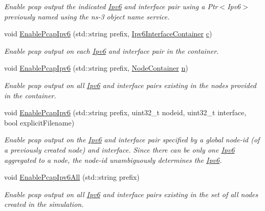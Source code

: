 \begin{DoxyCompactItemize}
\begin{DoxyCompactList}\small\item\em Enable pcap output the indicated \hyperlink{classns3_1_1Ipv6}{Ipv6} and interface pair using a Ptr$<$\+Ipv6$>$ previously named using the ns-\/3 object name service. \end{DoxyCompactList}\item 
void \hyperlink{classns3_1_1PcapHelperForIpv6_ab15e3eba350543f84b6fd16d2e2034ea}{Enable\+Pcap\+Ipv6} (std\+::string prefix, \hyperlink{classns3_1_1Ipv6InterfaceContainer}{Ipv6\+Interface\+Container} \hyperlink{mmwave_2model_2fading-traces_2fading__trace__generator_8m_ae0323a9039add2978bf5b49550572c7c}{c})
\begin{DoxyCompactList}\small\item\em Enable pcap output on each \hyperlink{classns3_1_1Ipv6}{Ipv6} and interface pair in the container. \end{DoxyCompactList}\item 
void \hyperlink{classns3_1_1PcapHelperForIpv6_ae4206173dfd9b487f208d28b72b91399}{Enable\+Pcap\+Ipv6} (std\+::string prefix, \hyperlink{classns3_1_1NodeContainer}{Node\+Container} \hyperlink{lte__link__budget__x2__handover__measures_8m_abdb05bc5a064cf642a06c83b3392f148}{n})
\begin{DoxyCompactList}\small\item\em Enable pcap output on all \hyperlink{classns3_1_1Ipv6}{Ipv6} and interface pairs existing in the nodes provided in the container. \end{DoxyCompactList}\item 
void \hyperlink{classns3_1_1PcapHelperForIpv6_a752abfab8560e9b57539d0e01d3ec1f1}{Enable\+Pcap\+Ipv6} (std\+::string prefix, uint32\+\_\+t nodeid, uint32\+\_\+t interface, bool explicit\+Filename)
\begin{DoxyCompactList}\small\item\em Enable pcap output on the \hyperlink{classns3_1_1Ipv6}{Ipv6} and interface pair specified by a global node-\/id (of a previously created node) and interface. Since there can be only one \hyperlink{classns3_1_1Ipv6}{Ipv6} aggregated to a node, the node-\/id unambiguously determines the \hyperlink{classns3_1_1Ipv6}{Ipv6}. \end{DoxyCompactList}\item 
void \hyperlink{classns3_1_1PcapHelperForIpv6_a69bdb66b1faf23a8b12cece74dbbfc28}{Enable\+Pcap\+Ipv6\+All} (std\+::string prefix)
\begin{DoxyCompactList}\small\item\em Enable pcap output on all \hyperlink{classns3_1_1Ipv6}{Ipv6} and interface pairs existing in the set of all nodes created in the simulation. \end{DoxyCompactList}\end{DoxyCompactItemize}


